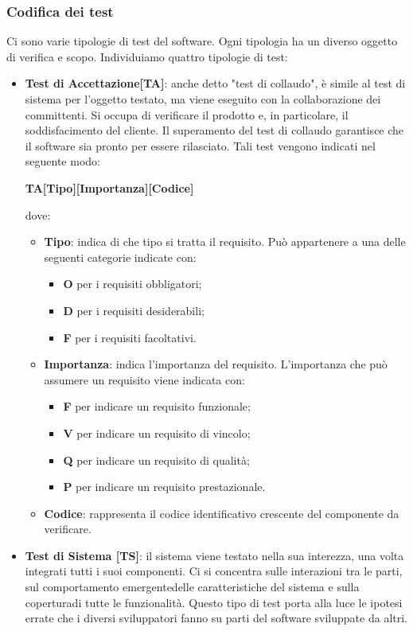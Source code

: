 		\subsubsection{Codifica dei test}
		Ci sono varie tipologie di test del software. Ogni tipologia ha un diverso oggetto di verifica e scopo. Individuiamo quattro tipologie di test:
		\begin{itemize}
			\item \textbf{Test di Accettazione[TA]}: anche detto "test di collaudo", è simile al test di sistema per l'oggetto testato, ma viene eseguito con la collaborazione dei committenti. Si occupa di verificare il prodotto e, in particolare, il soddisfacimento del cliente. Il superamento del test di collaudo garantisce che il software sia pronto per essere rilasciato. Tali test vengono indicati nel seguente modo: \\
			\centerline{\textbf{TA[Tipo][Importanza][Codice]}}
			dove:
			\begin{itemize}
				\item \textbf{Tipo}: indica di che tipo si tratta il requisito. Può
				appartenere a una delle seguenti categorie indicate con:
				\begin{itemize}
					\item \textbf{O} per i requisiti obbligatori;
					\item \textbf{D} per i requisiti desiderabili;
					\item \textbf{F} per i requisiti facoltativi.			
				\end{itemize}
				\item \textbf{Importanza}: indica l'importanza del requisito. L'importanza
				che può assumere un requisito viene indicata con:
				\begin{itemize}
					\item \textbf{F} per indicare un requisito funzionale;
					\item \textbf{V} per indicare un requisito di vincolo;
					\item \textbf{Q} per indicare un requisito di qualità;
					\item \textbf{P} per indicare un requisito prestazionale. 
				\end{itemize}
				\item \textbf{Codice}: rappresenta il codice identificativo crescente
				del componente da verificare.
			\end{itemize}
			\item \textbf{Test di Sistema [TS]}: il sistema viene testato nella sua interezza, una volta integrati tutti i suoi componenti. Ci si concentra sulle interazioni tra le parti, sul comportamento emergente\glosp delle caratteristiche del sistema e sulla copertura\glosp di tutte le funzionalità. Questo tipo di test porta alla luce le ipotesi errate che i diversi sviluppatori fanno su parti del software sviluppate da altri.

\end{itemize}
